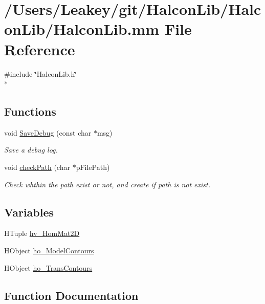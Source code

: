 \hypertarget{_halcon_lib_8mm}{}\section{/\+Users/\+Leakey/git/\+Halcon\+Lib/\+Halcon\+Lib/\+Halcon\+Lib.mm File Reference}
\label{_halcon_lib_8mm}
{\ttfamily \#include \char`\"{}Halcon\+Lib.\+h\char`\"{}}\\*
\subsection*{Functions}
\begin{DoxyCompactItemize}
\item 
void \hyperlink{_halcon_lib_8mm_a85c8849cac3c2a1a71d3e06f79512134}{Save\+Debug} (const char $\ast$msg)
\begin{DoxyCompactList}\small\item\em Save a debug log. \end{DoxyCompactList}\item 
void \hyperlink{_halcon_lib_8mm_acc60c39df87642dd02ddc919e50fbeaa}{check\+Path} (char $\ast$p\+File\+Path)
\begin{DoxyCompactList}\small\item\em Check whthin the path exist or not, and create if path is not exist. \end{DoxyCompactList}\end{DoxyCompactItemize}
\subsection*{Variables}
\begin{DoxyCompactItemize}
\item 
H\+Tuple \hyperlink{_halcon_lib_8mm_a0d254380a6b952b708031f003cc21f9b}{hv\+\_\+\+Hom\+Mat2D}
\item 
H\+Object \hyperlink{_halcon_lib_8mm_aed0453cf93e45f5dd8460027e7cfb00d}{ho\+\_\+\+Model\+Contours}
\item 
H\+Object \hyperlink{_halcon_lib_8mm_aaf1bcad70223e21a60f6b90a05ec3e13}{ho\+\_\+\+Trans\+Contours}
\end{DoxyCompactItemize}


\subsection{Function Documentation}
